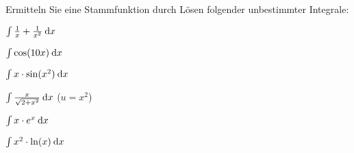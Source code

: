 \item Ermitteln Sie eine Stammfunktion durch Lösen folgender unbestimmter Integrale:
\begin{enumerate}
\begin{multicols}{2}
\item $\int \frac{1}{x} + \frac{1}{x^2} \:\mathrm{d}{x}$
\item $\int \cos(10x)\:\mathrm{d}{x}$
\item $\int x\cdot \sin(x^2) \:\mathrm{d}{x}$
\item $\int \frac{x}{\sqrt{2+x^2}} \:\mathrm{d}{x}$ ($u=x^2$)
\item $\int x \cdot e^x \:\mathrm{d}{x}$
\item $\int x^2 \cdot \ln(x) \:\mathrm{d}{x}$
\end{multicols}
\end{enumerate}

